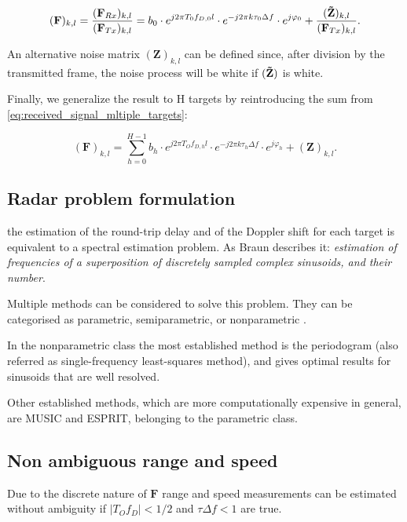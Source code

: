     \begin{equation}
        (\mathbf F)_{k,l} = \frac{(\mathbf F_{Rx})_{k,l}}{(\mathbf F_{Tx})_{k,l}} = b_0 \cdot e^{j2\pi T_0 f_{D,0} l}\cdot e^{-j2\pi k \tau_0 \Delta f} \cdot e^{j\varphi_0} + \frac{(\mathbf{\Tilde{Z}})_{k,l}}{(\mathbf F_{Tx})_{k,l}}.
    \end{equation}
    
    An alternative noise matrix $(\mathbf{Z})_{k,l}$ can be defined since, after division by the transmitted frame, the noise process will be white if $(\mathbf{\Tilde{Z}})$ is white.
    
    Finally, we generalize the result to H targets by reintroducing the sum from \ref{eq:received_signal_mltiple_targets}:
    
    \begin{equation}
        (\mathbf F)_{k,l} =  \sum_{h=0}^{H-1} b_h \cdot e^{j2\pi T_O f_{D,h} l}\cdot e^{-j2\pi k \tau_h \Delta f} \cdot e^{j\varphi_h} + (\mathbf{Z})_{k,l}.
    \end{equation}
    
    \subsection{Radar problem formulation}
    
    the estimation of the round-trip delay and of the Doppler shift for each target is equivalent to a spectral estimation problem. As Braun describes it: \textit{estimation of frequencies of a superposition of discretely sampled complex sinusoids, and their number}.
    
    Multiple methods can be considered to solve this problem. They can be categorised as parametric, semiparametric, or nonparametric \cite{Stoica_New_Method_Parameter_Estimation}. 
    
    In the nonparametric class the most established method is the periodogram (also referred as single-frequency least-squares method), and gives optimal results for sinusoids that are well resolved.
    
    Other established methods, which are more computationally expensive in general, are MUSIC and ESPRIT, belonging to the parametric class.
    
    \subsection{Non ambiguous range and speed}
    
        Due to the discrete nature of $\mathbf{F}$ range and speed measurements can be estimated without ambiguity if $|T_O f_D| < 1/2$ and $\tau \Delta f < 1$ are true.
        
